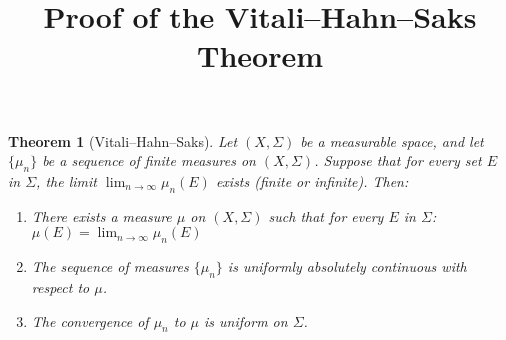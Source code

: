 \documentclass{article}
\newtheorem{theorem}{Theorem}
\begin{document}
\title{Proof of the Vitali--Hahn--Saks Theorem}
\author{}
\date{}

\maketitle

\begin{theorem}[Vitali--Hahn--Saks]
Let $(X, \Sigma)$ be a measurable space, and let $\{\mu_n\}$ be a sequence of finite measures on $(X, \Sigma)$. Suppose that for every set $E$ in $\Sigma$, the limit $\lim_{n\to\infty} \mu_n(E)$ exists (finite or infinite). Then:

\begin{enumerate}
    \item There exists a measure $\mu$ on $(X, \Sigma)$ such that for every $E$ in $\Sigma$: $\mu(E) = \lim_{n\to\infty} \mu_n(E)$
    \item The sequence of measures $\{\mu_n\}$ is uniformly absolutely continuous with respect to $\mu$.
    \item The convergence of $\mu_n$ to $\mu$ is uniform on $\Sigma$.
\end{enumerate}
\end{theorem}
\end{document}
